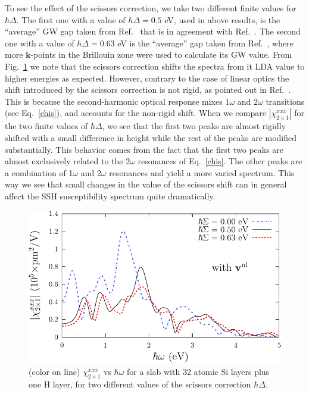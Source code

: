 \documentclass[floatfix,prb,aps,superscriptaddress,showpacs,letterpaper]{revtex4}
\begin{document}
To see the effect of the scissors correction, we take two different
finite values for $\hbar\Delta$. The first one
with a value of $\hbar\Delta=0.5$ eV, used in above results, 
is the ``average'' GW gap taken from 
Ref.~ 
that is in agreement with Ref.~. The second one
with a value of $\hbar\Delta=0.63$ eV is the ``average'' 
gap taken from Ref.~, 
where more $\mathbf{k}$-points in the Brillouin zone were 
used to calculate its GW value.
From Fig.~\ref{fig4}
we note that the scissors correction 
shifts the spectra from it LDA value to higher energies as expected.
 However, contrary 
to the case of linear optics\cite{cabellosPRB09} the shift introduced 
by the scissors correction is not 
rigid, as pointed out in Ref.~. 
 This is because the second-harmonic optical response mixes 
$1\omega$ and $2\omega$ transitions (see Eq.~\eqref{chis}), and accounts 
for the non-rigid shift. 
When we compare 
$|\chi^{xxx}_{2\times 1}|$ for the two finite values of $\hbar\Delta$,
we see that the first two peaks are almost rigidly 
shifted with a small difference in height while
the rest of the peaks are modified substantially. 
This behavior comes from the fact that the first two
peaks are almost exclusively related to the 
2$\omega$ resonances of
Eq.~\eqref{chis}. The other peaks are a combination 
of 1$\omega$ and 2$\omega$ resonances 
and yield a more varied spectrum. 
This way we see that small changes in the value of the 
scissors shift can in general affect the SSH susceptibility 
spectrum quite dramatically.
\begin{figure}
\centering 
\includegraphics[scale=.8]{plots/fig4}
\caption{(color on line) 
$\chi^{xxx}_{2\times 1}$
vs $\hbar\omega$ for a slab with 32 
atomic Si layers plus one H layer, 
for two different values of 
the scissors correction $\hbar\Delta$. 
\label{fig4}} 
\end{figure}
\end{document}
